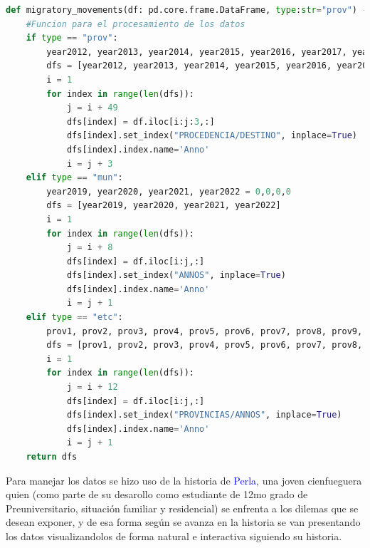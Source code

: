 \documentclass{article}
\begin{document}
\begin{lstlisting}[language=Python, caption=Funcion utilizada para parte del procesamiento de algunos datos]
    def migratory_movements(df: pd.core.frame.DataFrame, type:str="prov") -> list[pd.core.frame.DataFrame]:
    #Funcion para el procesamiento de los datos
    if type == "prov":
        year2012, year2013, year2014, year2015, year2016, year2017, year2018, year2019, year2020, year2021, year2022 = 0,0,0,0,0,0,0,0,0,0,0
        dfs = [year2012, year2013, year2014, year2015, year2016, year2017, year2018, year2019, year2020, year2021, year2022]
        i = 1
        for index in range(len(dfs)):
            j = i + 49
            dfs[index] = df.iloc[i:j:3,:]
            dfs[index].set_index("PROCEDENCIA/DESTINO", inplace=True)
            dfs[index].index.name='Anno'
            i = j + 3
    elif type == "mun":
        year2019, year2020, year2021, year2022 = 0,0,0,0
        dfs = [year2019, year2020, year2021, year2022]
        i = 1
        for index in range(len(dfs)):
            j = i + 8
            dfs[index] = df.iloc[i:j,:]
            dfs[index].set_index("ANNOS", inplace=True)
            dfs[index].index.name='Anno'
            i = j + 1
    elif type == "etc":
        prov1, prov2, prov3, prov4, prov5, prov6, prov7, prov8, prov9, prov10, prov11, prov12, prov13, prov14, prov15 = 0,0,0,0,0,0,0,0,0,0,0,0,0,0,0
        dfs = [prov1, prov2, prov3, prov4, prov5, prov6, prov7, prov8, prov9, prov10, prov11, prov12, prov13, prov14, prov15]
        i = 1
        for index in range(len(dfs)):
            j = i + 12
            dfs[index] = df.iloc[i:j,:]
            dfs[index].set_index("PROVINCIAS/ANNOS", inplace=True)
            dfs[index].index.name='Anno'
            i = j + 1                    
    return dfs
\end{lstlisting}

Para manejar los datos se hizo uso de la historia de \textcolor{blue}{Perla}, una joven cienfueguera quien (como parte de su desarollo como estudiante de 12mo grado de Preuniversitario, situación familiar y residencial) se enfrenta a los dilemas que se desean exponer, y de esa forma según se avanza en la historia se van presentando los datos visualizandolos de forma natural e interactiva siguiendo su historia.\\\\
\end{document}
